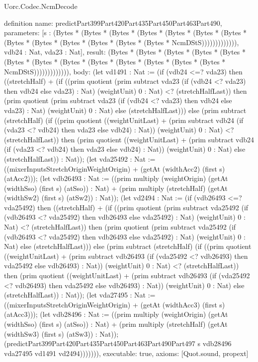 \begin{lexlean}{Uorc.Codec.NcmDecode}
\begin{semanticmodule}
definition{
  name: predictPart399Part420Part435Part450Part463Part490,
  parameters: [s : (Bytes * (Bytes * (Bytes * (Bytes * (Bytes * (Bytes * (Bytes * (Bytes * (Bytes * (Bytes * (Bytes * (Bytes * (Bytes * NcmDStS))))))))))))), vdb24 : Nat, vda23 : Nat],
  result: (Bytes * (Bytes * (Bytes * (Bytes * (Bytes * (Bytes * (Bytes * (Bytes * (Bytes * (Bytes * (Bytes * (Bytes * (Bytes * NcmDStS))))))))))))),
  body: (let vd1491 : Nat := (if (vdb24 <=? vda23) then ((stretchHalf) + (if ((prim quotient (prim subtract vda23 (if (vdb24 <? vda23) then vdb24 else vda23) : Nat) (weightUnit) 0 : Nat) <? (stretchHalfLast)) then (prim quotient (prim subtract vda23 (if (vdb24 <? vda23) then vdb24 else vda23) : Nat) (weightUnit) 0 : Nat) else (stretchHalfLast))) else (prim subtract (stretchHalf) (if ((prim quotient ((weightUnitLast) + (prim subtract vdb24 (if (vda23 <? vdb24) then vda23 else vdb24) : Nat)) (weightUnit) 0 : Nat) <? (stretchHalfLast)) then (prim quotient ((weightUnitLast) + (prim subtract vdb24 (if (vda23 <? vdb24) then vda23 else vdb24) : Nat)) (weightUnit) 0 : Nat) else (stretchHalfLast)) : Nat)); (let vda25492 : Nat := ((mixerInputsStretchOriginWeightOrigin) + (getAt (widthAcc2) (first s) (atAcc2))); (let vdb26493 : Nat := ((prim multiply (weightOrigin) (getAt (widthSso) (first s) (atSso)) : Nat) + (prim multiply (stretchHalf) (getAt (widthSw2) (first s) (atSw2)) : Nat)); (let vd2494 : Nat := (if (vdb26493 <=? vda25492) then ((stretchHalf) + (if ((prim quotient (prim subtract vda25492 (if (vdb26493 <? vda25492) then vdb26493 else vda25492) : Nat) (weightUnit) 0 : Nat) <? (stretchHalfLast)) then (prim quotient (prim subtract vda25492 (if (vdb26493 <? vda25492) then vdb26493 else vda25492) : Nat) (weightUnit) 0 : Nat) else (stretchHalfLast))) else (prim subtract (stretchHalf) (if ((prim quotient ((weightUnitLast) + (prim subtract vdb26493 (if (vda25492 <? vdb26493) then vda25492 else vdb26493) : Nat)) (weightUnit) 0 : Nat) <? (stretchHalfLast)) then (prim quotient ((weightUnitLast) + (prim subtract vdb26493 (if (vda25492 <? vdb26493) then vda25492 else vdb26493) : Nat)) (weightUnit) 0 : Nat) else (stretchHalfLast)) : Nat)); (let vda27495 : Nat := ((mixerInputsStretchOriginWeightOrigin) + (getAt (widthAcc3) (first s) (atAcc3))); (let vdb28496 : Nat := ((prim multiply (weightOrigin) (getAt (widthSso) (first s) (atSso)) : Nat) + (prim multiply (stretchHalf) (getAt (widthSw3) (first s) (atSw3)) : Nat)); (predictPart399Part420Part435Part450Part463Part490Part497 s vdb28496 vda27495 vd1491 vd2494))))))),
  executable: true,
  axioms: [Quot.sound, propext]
}


\end{semanticmodule}
\end{lexlean}

